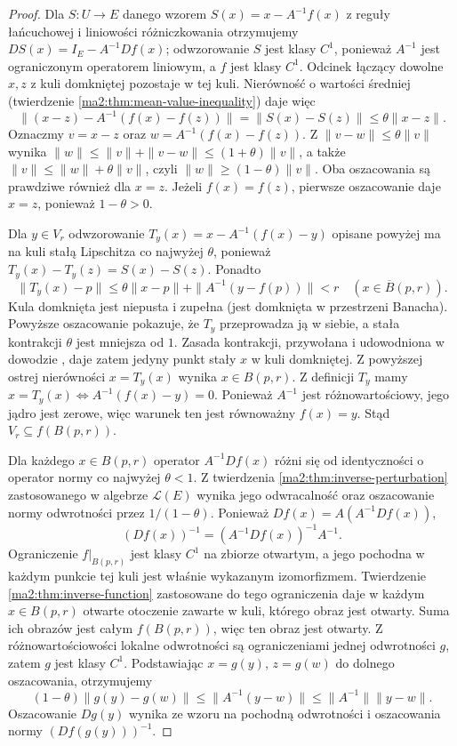 \begin{proof}
Dla $S:U\to E$ danego wzorem $S(x)=x-A^{-1}f(x)$
z reguły łańcuchowej i liniowości różniczkowania
otrzymujemy $DS(x)=I_E-A^{-1}Df(x)$; odwzorowanie $S$
jest klasy $C^1$, ponieważ $A^{-1}$ jest ograniczonym
operatorem liniowym, a $f$ jest klasy $C^1$. Odcinek łączący dowolne
$x,z$ z kuli domkniętej pozostaje w tej kuli.
Nierówność o wartości średniej
(twierdzenie \ref{ma2:thm:mean-value-inequality})
daje więc
\[
 \|(x-z)-A^{-1}(f(x)-f(z))\|
 =\|S(x)-S(z)\|\le\theta\|x-z\|.
\]
Oznaczmy $v=x-z$ oraz $w=A^{-1}(f(x)-f(z))$.
Z $\|v-w\|\le\theta\|v\|$ wynika
$\|w\|\le\|v\|+\|v-w\|\le(1+\theta)\|v\|$,
a także $\|v\|\le\|w\|+\theta\|v\|$,
czyli $\|w\|\ge(1-\theta)\|v\|$.
Oba oszacowania są prawdziwe również dla $x=z$.
Jeżeli $f(x)=f(z)$, pierwsze oszacowanie daje $x=z$,
ponieważ $1-\theta>0$.

Dla $y\in V_r$ odwzorowanie $T_y(x)=x-A^{-1}(f(x)-y)$
opisane powyżej ma na
kuli stałą Lipschitza co najwyżej $\theta$, ponieważ
$T_y(x)-T_y(z)=S(x)-S(z)$. Ponadto
\[
 \|T_y(x)-p\|\le\theta\|x-p\|
   +\|A^{-1}(y-f(p))\|<r
 \quad(x\in\overline B(p,r)).
\]
Kula domknięta jest niepusta i zupełna (jest domknięta
w przestrzeni Banacha). Powyższe oszacowanie pokazuje,
że $T_y$ przeprowadza ją w siebie, a stała kontrakcji
$\theta$ jest mniejsza od $1$.
Zasada kontrakcji, przywołana i udowodniona w dowodzie
,
daje zatem jedyny punkt stały $x$ w kuli domkniętej. Z powyższej ostrej nierówności
$x=T_y(x)$ wynika $x\in B(p,r)$.
Z definicji $T_y$ mamy
$x=T_y(x)\iff A^{-1}(f(x)-y)=0$.
Ponieważ $A^{-1}$ jest różnowartościowy, jego jądro
jest zerowe, więc warunek ten jest równoważny $f(x)=y$.
Stąd $V_r\subseteq f(B(p,r))$.

Dla każdego $x\in B(p,r)$ operator $A^{-1}Df(x)$
różni się od identyczności o operator normy
co najwyżej $\theta<1$. Z twierdzenia
\ref{ma2:thm:inverse-perturbation} zastosowanego
w algebrze $\mathcal L(E)$ wynika jego odwracalność
oraz oszacowanie normy odwrotności przez $1/(1-\theta)$.
Ponieważ $Df(x)=A(A^{-1}Df(x))$,
\[
 (Df(x))^{-1}=(A^{-1}Df(x))^{-1}A^{-1}.
\]
Ograniczenie $f|_{B(p,r)}$ jest klasy $C^1$
na zbiorze otwartym, a jego pochodna w każdym punkcie
tej kuli jest właśnie wykazanym izomorfizmem.
Twierdzenie \ref{ma2:thm:inverse-function}
zastosowane do tego ograniczenia daje w każdym
$x\in B(p,r)$ otwarte otoczenie zawarte w kuli,
którego obraz jest otwarty. Suma ich obrazów jest całym $f(B(p,r))$,
więc ten obraz jest otwarty. Z różnowartościowości
lokalne odwrotności są ograniczeniami jednej
odwrotności $g$, zatem $g$ jest klasy $C^1$.
Podstawiając $x=g(y)$, $z=g(w)$ do dolnego
oszacowania, otrzymujemy
\[
 (1-\theta)\|g(y)-g(w)\|
 \le\|A^{-1}(y-w)\|\le\|A^{-1}\|\|y-w\|.
\]
Oszacowanie $Dg(y)$ wynika ze wzoru na pochodną
odwrotności i oszacowania normy $(Df(g(y)))^{-1}$.
\end{proof}

